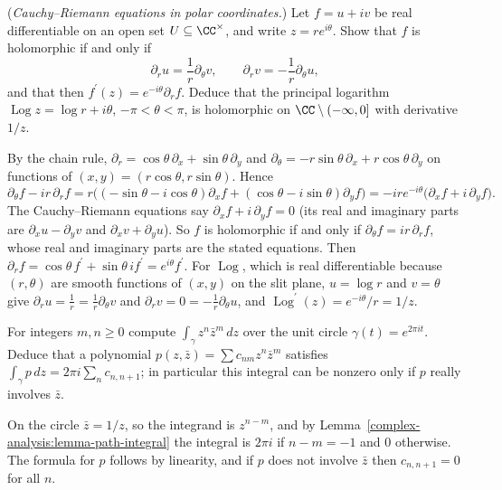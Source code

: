 \begin{exercise}\label{complex-analysis:exercise-polar-cauchy-riemann}
(\emph{Cauchy--Riemann equations in polar coordinates.}) Let $f = u + iv$ be real differentiable on an open set $U \subseteq \CC^\times$, and write $z = re^{i\theta}$. Show that $f$ is holomorphic if and
only if
\[
\partial_ru = \frac1r\partial_\theta v, \qquad \partial_rv = -\frac1r\partial_\theta u,
\]
and that then $f^{\prime}(z) = e^{-i\theta}\partial_rf$. Deduce that the principal logarithm $\operatorname{Log}z = \log r + i\theta$, $-\pi < \theta < \pi$, is holomorphic on $\CC \setminus (-\infty, 0]$ with
derivative $1/z$.
\end{exercise}

\begin{solution}
By the chain rule, $\partial_r = \cos\theta\,\partial_x + \sin\theta\,\partial_y$ and $\partial_\theta = -r\sin\theta\,\partial_x + r\cos\theta\,\partial_y$ on functions of $(x, y) = (r\cos\theta, r\sin\theta)$. Hence
\[
\partial_\theta f - ir\,\partial_rf = r\bigl((-\sin\theta - i\cos\theta)\partial_xf + (\cos\theta - i\sin\theta)\partial_yf\bigr) = -ire^{-i\theta}\bigl(\partial_xf + i\,\partial_yf\bigr).
\]
The Cauchy--Riemann equations say $\partial_xf + i\,\partial_yf = 0$ (its real and imaginary parts are $\partial_xu - \partial_yv$ and $\partial_xv + \partial_yu$). So $f$ is holomorphic if and only if
$\partial_\theta f = ir\,\partial_rf$, whose real and imaginary parts are the stated equations. Then $\partial_rf = \cos\theta\,f^{\prime} + \sin\theta\,if^{\prime} = e^{i\theta}f^{\prime}$. For
$\operatorname{Log}$, which is real differentiable because $(r, \theta)$ are smooth functions of $(x, y)$ on the slit plane, $u = \log r$ and $v = \theta$ give $\partial_ru = \frac1r = \frac1r\partial_\theta v$ and
$\partial_rv = 0 = -\frac1r\partial_\theta u$, and $\operatorname{Log}^{\prime}(z) = e^{-i\theta}/r = 1/z$.
\end{solution}

\begin{exercise}\label{complex-analysis:exercise-circle-monomials}
For integers $m, n \geq 0$ compute $\int_\gamma z^n\bar z^m\,dz$ over the unit circle $\gamma(t) = e^{2\pi it}$. Deduce that a polynomial $p(z, \bar z) = \sum c_{nm}z^n\bar z^m$ satisfies
$\int_\gamma p\,dz = 2\pi i\sum_nc_{n,n+1}$; in particular this integral can be nonzero only if $p$ really involves $\bar z$.
\end{exercise}

\begin{solution}
On the circle $\bar z = 1/z$, so the integrand is $z^{n-m}$, and by Lemma~\ref{complex-analysis:lemma-path-integral} the integral is $2\pi i$ if $n - m = -1$ and $0$ otherwise. The formula for $p$ follows by
linearity, and if $p$ does not involve $\bar z$ then $c_{n,n+1} = 0$ for all $n$.
\end{solution}

